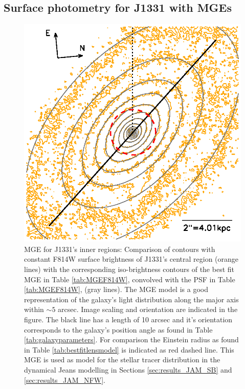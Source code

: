 \subsection{Surface photometry for J1331 with MGEs} \label{sec:MGE_results}


\begin{figure}
\centering
\includegraphics[width=0.8\columnwidth]{fig/1331F814Wsci_MGE_M.ps}
\caption{MGE for J1331's inner regions: Comparison of contours with constant F814W surface brightness of J1331's central region (orange lines) with the corresponding iso-brightness contours of the best fit MGE in Table \ref{tab:MGEF814W}, convolved with the PSF in Table \ref{tab:MGEF814W}, (gray lines). The MGE model is a good representation of the galaxy's light distribution along the major axis within $\sim 5$ arcsec. Image scaling and orientation are indicated in the figure. The black line has a length of 10 arcsec and it's orientation corresponds to the galaxy's position angle as found in Table \ref{tab:galaxyparameters}. For comparison the Einstein radius as found in Table \ref{tab:bestfitlensmodel}  is indicated as red dashed line. This MGE is used as model for the stellar tracer distribution in the dynamical Jeans modelling in Sections \ref{sec:results_JAM_SB} and \ref{sec:results_JAM_NFW}.}
\label{fig:MGEinnerRegions}
\end{figure}

